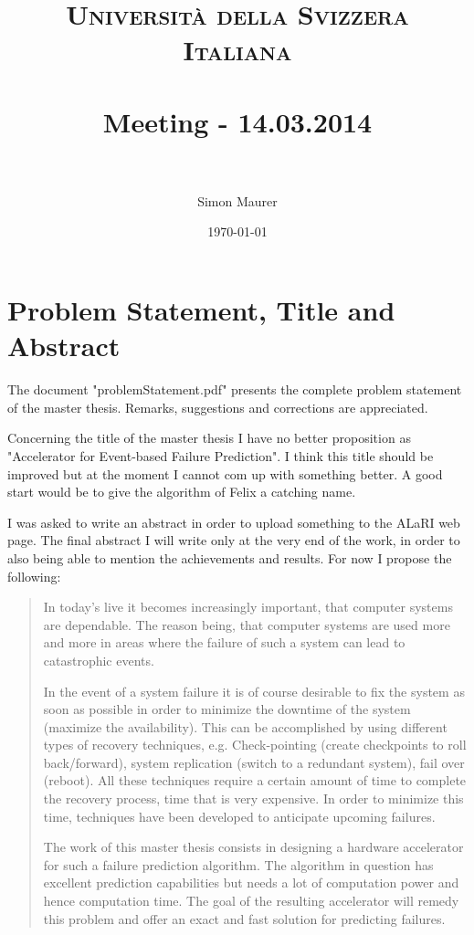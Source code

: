 \documentclass[paper=a4, fontsize=11pt]{scrartcl} %
\title{	
\normalfont \normalsize 
\textsc{Università della Svizzera Italiana} \\ [25pt] %
\horrule{0.5pt} \\[0.4cm] %
\huge Meeting - 14.03.2014 \\ %
\horrule{2pt} \\[0.5cm] %
}
\author{Simon Maurer} %
\date{\normalsize\today} %
\begin{document}
\maketitle %


\section{Problem Statement, Title and Abstract}
The document "problemStatement.pdf" presents the complete problem statement of
the master thesis. Remarks, suggestions and corrections are appreciated.

Concerning the title of the master thesis I have no better proposition as
"Accelerator for Event-based Failure Prediction". I think this title should be
improved but at the moment I cannot com up with something better. A good start
would be to give the algorithm of Felix a catching name.

I was asked to write an abstract in order to upload something to the ALaRI web
page. The final abstract I will write only at the very end of the work, in
order to also being able to mention the achievements and results. For now
I propose the following:

\begin{quotation}
In today's live it becomes increasingly important, that computer systems are
dependable. The reason being, that computer systems are used more and more in
areas where the failure of such a system can lead to catastrophic events.

In the event of a system failure it is of course desirable to fix the system as
soon as possible in order to minimize the downtime of the system (maximize the
availability). This can be accomplished by using different types of recovery
techniques, e.g. Check-pointing (create checkpoints to roll back/forward),
system replication (switch to a redundant system), fail over (reboot). All these
techniques require a certain amount of time to complete the recovery process,
time that is very expensive. In order to minimize this time, techniques have
been developed to anticipate upcoming failures.

The work of this master thesis consists in designing a hardware accelerator for
such a failure prediction algorithm. The algorithm in question has excellent
prediction capabilities but needs a lot of computation power and hence
computation time. The goal of the resulting accelerator will remedy this
problem and offer an exact and fast solution for predicting failures.
\end{quotation}
\end{document}
